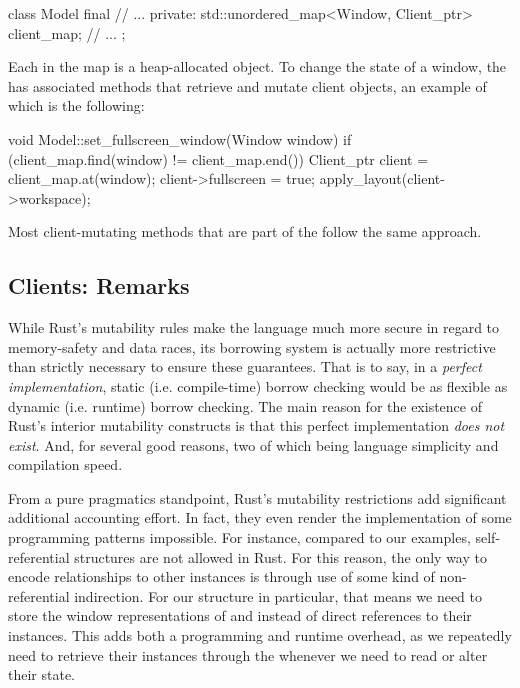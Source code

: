 \begin{cppblock}
  class Model final
  {
    // ...
  private:
    std::unordered_map<Window, Client_ptr> client_map;
    // ...
  };
\end{cppblock}

Each  in the map is a heap-allocated object. To change the
state of a window, the  has associated methods that retrieve and
mutate client objects, an example of which is the following:

\begin{cppblock}
  void
  Model::set_fullscreen_window(Window window)
  {
    if (client_map.find(window) != client_map.end()) {
      Client_ptr client = client_map.at(window);
      client->fullscreen = true;
      apply_layout(client->workspace);
    }
  }
\end{cppblock}

Most client-mutating methods that are part of the  follow the same
approach.

\subsection{Clients: Remarks}

While Rust's mutability rules make the language much more secure in regard to
memory-safety and data races, its borrowing system is actually more restrictive
than strictly necessary to ensure these guarantees. That is to say, in a
\textit{perfect implementation}, static (i.e. compile-time) borrow checking
would be as flexible as dynamic (i.e. runtime) borrow checking. The main reason
for the existence of Rust's interior mutability constructs is that this perfect
implementation \textit{does not exist}. And, for several good reasons, two of
which being language simplicity and compilation speed.

From a pure pragmatics standpoint, Rust's mutability restrictions add
significant additional accounting effort. In fact, they even render the
implementation of some programming patterns impossible. For instance, compared
to our \cpp examples, self-referential structures are not allowed in Rust.
For this reason, the only way to encode relationships to other instances is
through use of some kind of non-referential indirection. For our 
structure in particular, that means we need to store the window representations
of  and  instead of direct references to their
 instances. This adds both a programming and runtime overhead, as
we repeatedly need to retrieve their instances through the 
whenever we need to read or alter their state.



